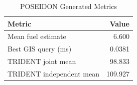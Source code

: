 \begin{table}[h]
\centering
\caption{POSEIDON Generated Metrics}
\begin{tabular}{lr}
\toprule
Metric & Value \\
\midrule
Mean fuel estimate & 6.600 \\
Best GIS query (ms) & 0.0381 \\
TRIDENT joint mean & 98.833 \\
TRIDENT independent mean & 109.927 \\
\bottomrule
\end{tabular}
\end{table}
